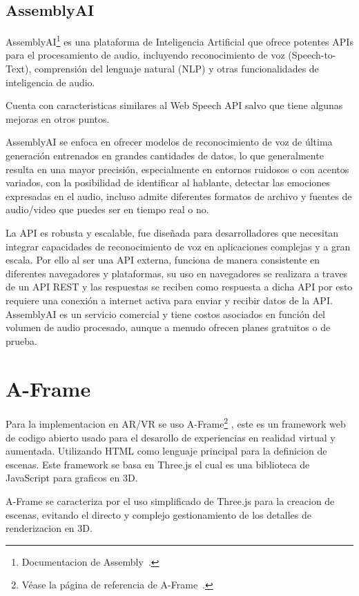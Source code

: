\documentclass[a4paper, 12pt]{book}
\let\cleardoublepage\clearpage
\begin{document}
\subsection{AssemblyAI}

AssemblyAI\footnote{Documentacion de Assembly~\cite{assemblyai_about}.} es una plataforma de Inteligencia Artificial que ofrece potentes APIs para el procesamiento de audio, incluyendo reconocimiento de voz (Speech-to-Text), comprensión del lenguaje natural (NLP) y otras funcionalidades de inteligencia de audio.

Cuenta con caracteristicas similares al Web Speech API salvo que tiene algunas mejoras en otros puntos.

AssemblyAI se enfoca en ofrecer modelos de reconocimiento de voz de última generación entrenados en grandes cantidades de datos, lo que generalmente resulta en una mayor precisión, especialmente en entornos ruidosos o con acentos variados, con la posibilidad de identificar al hablante, detectar las emociones expresadas en el audio, incluso admite diferentes formatos de archivo y fuentes de audio/video que puedes ser en tiempo real o no.

La API es robusta y escalable, fue diseñada para desarrolladores que necesitan integrar capacidades de reconocimiento de voz en aplicaciones complejas y a gran escala. Por ello al ser una API externa, funciona de manera consistente en diferentes navegadores y plataformas, su uso en navegadores se realizara a traves de un API REST y las respuestas se reciben como respuesta a dicha API por esto requiere una conexión a internet activa para enviar y recibir datos de la API. AssemblyAI es un servicio comercial y tiene costos asociados en función del volumen de audio procesado, aunque a menudo ofrecen planes gratuitos o de prueba.

\cleardoublepage
\section{A-Frame} 
\label{sec:seccion2}

Para la implementacion en AR/VR se uso A-Frame\footnote{Véase la página de referencia de A-Frame~\cite{aframe2025}.}
, este es un framework web de codigo abierto usado para el desarollo de experiencias en realidad virtual y aumentada. Utilizando HTML como lenguaje principal para la definicion de escenas. Este framework se basa en Three.js el cual es una biblioteca de JavaScript para graficos en 3D.

A-Frame se caracteriza por el uso simplificado de Three.js para la creacion de escenas, evitando el directo y complejo gestionamiento de los detalles de renderizacion en 3D.
\end{document}
